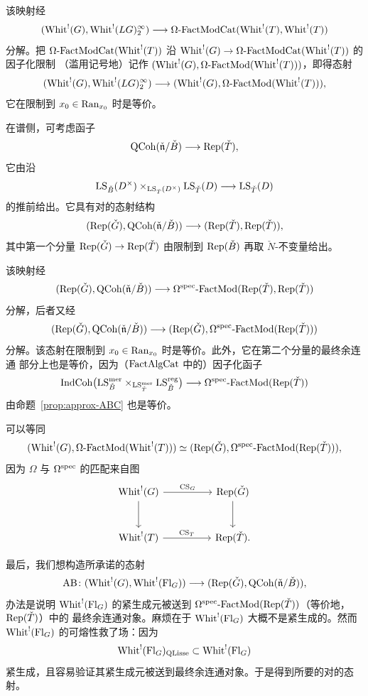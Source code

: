 该映射经
\[
(\mathrm{Whit}^{!}(G),\mathrm{Whit}^{!}(LG)^{\infty}_{2})\longrightarrow
\Omega\text{-}\mathrm{FactModCat}(\mathrm{Whit}^{!}(T),\mathrm{Whit}^{!}(T))
\]
分解。把 $\Omega\text{-}\mathrm{FactModCat}(\mathrm{Whit}^{!}(T))$ 沿
$\mathrm{Whit}^{!}(G)\to \Omega\text{-}\mathrm{FactModCat}(\mathrm{Whit}^{!}(T))$ 的因子化限制
（滥用记号地）记作 $(\mathrm{Whit}^{!}(G),\Omega\text{-}\mathrm{FactMod}(\mathrm{Whit}^{!}(T)))$，即得态射
\[
(\mathrm{Whit}^{!}(G),\mathrm{Whit}^{!}(LG)^{\infty}_{2})\longrightarrow
(\mathrm{Whit}^{!}(G),\Omega\text{-}\mathrm{FactMod}(\mathrm{Whit}^{!}(T))),
\]
它在限制到 $x_0\in \mathrm{Ran}_{x_0}$ 时是等价。

在谱侧，可考虑函子
\[
\mathrm{QCoh}(\check{\mathfrak{n}}/\check B)\longrightarrow \mathrm{Rep}(\check T),
\]
它由沿
\[
\mathrm{LS}_{\check B}(D^\times)\times_{\mathrm{LS}_{\check T}(D^\times)}\mathrm{LS}_{\check T}(D)
\longrightarrow \mathrm{LS}_{\check T}(D)
\]
的推前给出。它具有对的态射结构
\[
(\mathrm{Rep}(\check G),\mathrm{QCoh}(\check{\mathfrak{n}}/\check B))\longrightarrow
(\mathrm{Rep}(\check T),\mathrm{Rep}(\check T)),
\]
其中第一个分量 $\mathrm{Rep}(\check G)\to \mathrm{Rep}(\check T)$ 由限制到 $\mathrm{Rep}(\check B)$ 再取
$\check N$-不变量给出。

该映射经
\[
(\mathrm{Rep}(\check G),\mathrm{QCoh}(\check{\mathfrak{n}}/\check B))\longrightarrow
\Omega^{\mathrm{spec}}\text{-}\mathrm{FactMod}(\mathrm{Rep}(\check T),\mathrm{Rep}(\check T))
\]
分解，后者又经
\[
(\mathrm{Rep}(\check G),\mathrm{QCoh}(\check{\mathfrak{n}}/\check B))\longrightarrow
(\mathrm{Rep}(\check G),\Omega^{\mathrm{spec}}\text{-}\mathrm{FactMod}(\mathrm{Rep}(\check T)))
\]
分解。该态射在限制到 $x_0\in \mathrm{Ran}_{x_0}$ 时是等价。此外，它在第二个分量的最终余连通
部分上也是等价，因为（$\mathrm{FactAlgCat}$ 中的）因子化函子
\[
\mathrm{IndCoh}\bigl(\mathrm{LS}^{\mathrm{mer}}_{\check B}\times_{\mathrm{LS}^{\mathrm{mer}}_{\check T}}
\mathrm{LS}^{\mathrm{reg}}_{\check B}\bigr)\longrightarrow
\Omega^{\mathrm{spec}}\text{-}\mathrm{FactMod}(\mathrm{Rep}(\check T))
\]
由命题~\ref{prop:approx-ABC} 也是等价。

可以等同
\[
(\mathrm{Whit}^{!}(G),\Omega\text{-}\mathrm{FactMod}(\mathrm{Whit}^{!}(T)))
\simeq (\mathrm{Rep}(\check G),\Omega^{\mathrm{spec}}\text{-}\mathrm{FactMod}(\mathrm{Rep}(\check T))),
\]
因为 $\Omega$ 与 $\Omega^{\mathrm{spec}}$ 的匹配来自图
\[
\begin{tikzcd}[column sep=huge,row sep=large]
\Whit^{!}(G) \arrow[r,"\mathrm{CS}_G"] \arrow[d] & \Rep(\check G) \arrow[d]\\
\Whit^{!}(T) \arrow[r,"\mathrm{CS}_T"] & \Rep(\check T).
\end{tikzcd}
\]

最后，我们想构造所承诺的态射
\[
\mathrm{AB}\colon
(\mathrm{Whit}^{!}(G),\mathrm{Whit}^{!}(\mathrm{Fl}_G))\longrightarrow
(\mathrm{Rep}(\check G),\mathrm{QCoh}(\check{\mathfrak{n}}/\check B)),
\]
办法是说明 $\mathrm{Whit}^{!}(\mathrm{Fl}_G)$ 的紧生成元被送到
$\Omega^{\mathrm{spec}}\text{-}\mathrm{FactMod}(\mathrm{Rep}(\check T))$（等价地，$\mathrm{Rep}(\check T)$）中的
最终余连通对象。麻烦在于 $\mathrm{Whit}^{!}(\mathrm{Fl}_G)$ 大概不是紧生成的。然而
$\mathrm{Whit}^{!}(\mathrm{Fl}_G)$ 的可熔性救了场：因为
\[
\mathrm{Whit}^{!}(\mathrm{Fl}_G)_{\mathrm{QLisse}}\subset \mathrm{Whit}^{!}(\mathrm{Fl}_G)
\]
紧生成，且容易验证其紧生成元被送到最终余连通对象。于是得到所要的对的态射。

